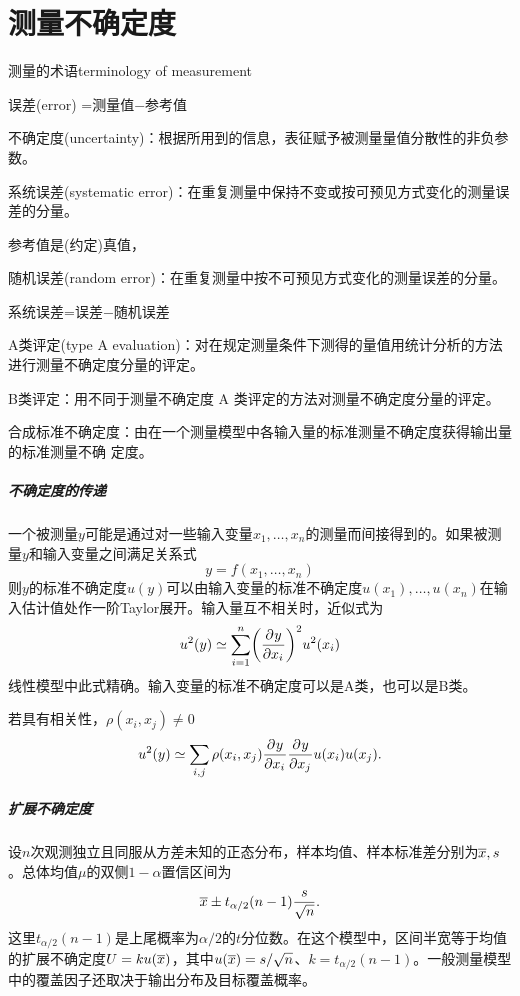 \chapter{测量不确定度}
\begin{definition}{测量的术语}{terminology of measurement}
	\begin{compactitem}
		\item 误差(error) =测量值$-$参考值
		\item 不确定度(uncertainty)：根据所用到的信息，表征赋予被测量量值分散性的非负参数。
		\item 系统误差(systematic error)：在重复测量中保持不变或按可预见方式变化的测量误差的分量。
		
		参考值是(约定)真值，
		\item 随机误差(random error)：在重复测量中按不可预见方式变化的测量误差的分量。
		
		系统误差=误差$-$随机误差
		\item A类评定(type A evaluation)：对在规定测量条件下测得的量值用统计分析的方法进行测量不确定度分量的评定。
		\item B类评定：用不同于测量不确定度 A 类评定的方法对测量不确定度分量的评定。
		\item 合成标准不确定度：由在一个测量模型中各输入量的标准测量不确定度获得输出量的标准测量不确	定度。
	\end{compactitem}
\end{definition}
\paragraph{不确定度的传递}
一个被测量$ y $可能是通过对一些输入变量$x_1,\ldots,x_n$的测量而间接得到的。如果被测量$ y $和输入变量之间满足关系式
\[
	y = f(x_1,\ldots,x_n)
\]
则$ y $的标准不确定度$ u(y) $可以由输入变量的标准不确定度$u(x_1),\ldots,u(x_n)$在输入估计值处作一阶Taylor展开。输入量互不相关时，近似式为
\begin{equation}
	u^2(y) \simeq \sum_{i=1}^n\biggl(\frac{\partial^{}y}{\partial{x_i}^{}}\biggr)^2u^2(x_i)
\end{equation}
线性模型中此式精确。输入变量的标准不确定度可以是A类，也可以是B类。

若具有相关性，$\rho(x_i,x_j) \neq 0$
\begin{equation}
	u^2(y) \simeq \sum_{i,j}\rho(x_i,x_j)\frac{\partial^{}y}{\partial{x_i}^{}}\frac{\partial^{}y}{\partial{x_j}^{}}u(x_i)u(x_j).
\end{equation}
\paragraph{扩展不确定度}
设$n$次观测独立且同服从方差未知的正态分布，样本均值、样本标准差分别为$\overline{x},s$。总体均值$\mu$的双侧$1 - \alpha$置信区间为
\[
	\overline{x} \pm t_{\alpha/2}(n - 1)\frac{s}{\sqrt n}.
\]
这里$t_{\alpha/2}(n - 1)$是上尾概率为$\alpha/2$的$t$分位数。在这个模型中，区间半宽等于均值的扩展不确定度$U = k u(\overline{x})$，其中$u(\overline{x}) = s/\sqrt n$、$k = t_{\alpha/2}(n - 1)$。一般测量模型中的覆盖因子还取决于输出分布及目标覆盖概率。
